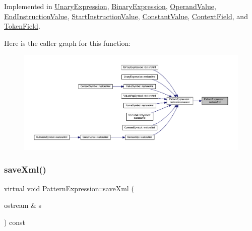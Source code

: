 Implemented in \mbox{\hyperlink{class_unary_expression_ab9b25fcf136b758b13a4cbdcc401db69}{Unary\+Expression}}, \mbox{\hyperlink{class_binary_expression_a05e25a311c4f20e01317a707668cf71c}{Binary\+Expression}}, \mbox{\hyperlink{class_operand_value_a65387cdd12b8e6135bd9899c76dd2f39}{Operand\+Value}}, \mbox{\hyperlink{class_end_instruction_value_a6909b360cf6bdfc41fc1bc5d15bf9df3}{End\+Instruction\+Value}}, \mbox{\hyperlink{class_start_instruction_value_a3b8738c1509a0e0ee7a373f3c4f22653}{Start\+Instruction\+Value}}, \mbox{\hyperlink{class_constant_value_a93170b89c5eabd65c8f66501d584c60d}{Constant\+Value}}, \mbox{\hyperlink{class_context_field_a6d877297cc00c922dea6a1cfe12bec09}{Context\+Field}}, and \mbox{\hyperlink{class_token_field_a6c2c56a97eeb763ee32c4d66770e1c2f}{Token\+Field}}.

Here is the caller graph for this function\+:
\nopagebreak
\begin{figure}[H]
\begin{center}
\leavevmode
\includegraphics[width=350pt]{class_pattern_expression_ad8986afdddbe7a8b64fdcf10478b5715_icgraph}
\end{center}
\end{figure}
\mbox{\label{class_pattern_expression_a0d9c89ffbf4a22fac68189a845cde92a}} 
\subsubsection{\texorpdfstring{saveXml()}{saveXml()}}
{\footnotesize\ttfamily virtual void Pattern\+Expression\+::save\+Xml (\begin{DoxyParamCaption}\item[{ostream \&}]{s }\end{DoxyParamCaption}) const\hspace{0.3cm}{\ttfamily [pure virtual]}}



